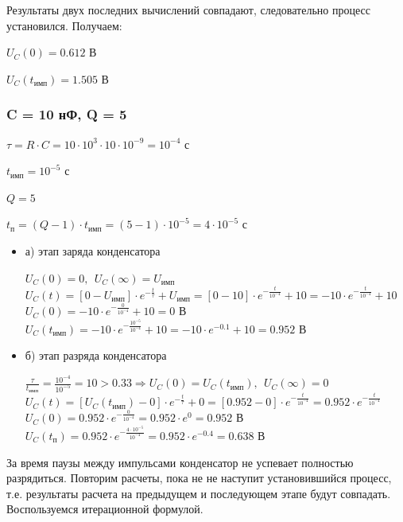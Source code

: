 \documentclass[a4paper,14pt]{extarticle}
\begin{document}
Результаты двух последних вычислений совпадают, следовательно процесс установился. Получаем:
	
$U_C(0) = 0.612 \text{ В}$
	
$U_C(t_\text{имп}) = 1.505 \text{ В}$
	
\subsubsection{C = 10 нФ, Q = 5}

$\tau = R \cdot C = 10 \cdot 10^3 \cdot 10 \cdot 10^{-9} = 10^{-4} \text{ с}$

$t_\text{имп} = 10^{-5} \text{ с}$

$Q = 5$		

$t_\text{п} = (Q - 1) \cdot t_\text{имп} = (5 - 1) \cdot 10^{-5} = 4 \cdot 10^{-5} \text{ с}$
			
\begin{itemize}
\item[] а) этап заряда конденсатора

	$U_C(0) = 0,\ \ U_C(\infty) = U_\text{имп}$\\	
	$U_C(t) = [0 - U_\text{имп}] \cdot e^{-\frac{t}{\tau}} + U_\text{имп} = [0 - 10] \cdot e^{-\frac{t}{10^{-4}}} + 10 = -10 \cdot e^{-\frac{t}{10^{-4}}} + 10$\\
	$U_C(0) = -10 \cdot e^{-\frac{0}{10^{-4}}} + 10 = 0 \text{ В}$\\
	$U_C(t_\text{имп}) = -10 \cdot e^{-\frac{10^{-5}}{10^{-4}}} + 10 = -10 \cdot e^{-0.1} + 10 = 0.952 \text{ В}$
	
\item[] б) этап разряда конденсатора

	$\frac{\tau}{t_\text{имп}} = \frac{10^{-4}}{10^{-5}} = 10 > 0.33 \Rightarrow U_C(0) = U_C(t_\text{имп}),\ \ U_C(\infty) = 0$\\
	$U_C(t) = [U_C(t_\text{имп}) - 0] \cdot e^{-\frac{t}{\tau}} + 0 =  [0.952 - 0] \cdot e^{-\frac{t}{10^{-4}}} = 0.952 \cdot e^{-\frac{t}{10^{-4}}}$\\
	$U_C(0) = 0.952 \cdot e^{-\frac{0}{10^{-4}}} = 0.952 \cdot e^0 = 0.952 \text{ В}$\\
	$U_C(t_\text{п}) = 0.952 \cdot e^{-\frac{4 \cdot 10^{-5}}{10^{-4}}} = 0.952 \cdot e^{-0.4} = 0.638 \text{ В}$
\end{itemize}				
		
За время паузы между импульсами конденсатор не успевает полностью разрядиться. Повторим расчеты, пока не не наступит установившийся процесс, т.е. результаты расчета на предыдущем и последующем этапе будут совпадать.	Воспользуемся итерационной формулой.
\end{document}
